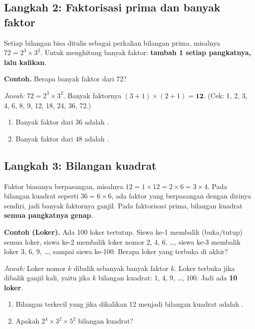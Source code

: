 \documentclass[11pt,a4paper]{article}
\begin{document}
\subsection*{Langkah 2: Faktorisasi prima dan banyak faktor}
Setiap bilangan bisa ditulis sebagai perkalian bilangan prima, misalnya $72 = 2^3 \times 3^2$.
Untuk menghitung banyak faktor: \textbf{tambah 1 setiap pangkatnya, lalu kalikan}.

\begin{contoh}
\textbf{Contoh.} Berapa banyak faktor dari 72?

\textit{Jawab:} $72 = 2^3 \times 3^2$. Banyak faktornya $(3 + 1) \times (2 + 1) = \textbf{12}$.
(Cek: 1, 2, 3, 4, 6, 8, 9, 12, 18, 24, 36, 72.)
\end{contoh}

\begin{giliranmu}
\begin{enumerate}[label=\alph*.]
    \item Banyak faktor dari $36$ adalah \kosong.
    \item Banyak faktor dari $48$ adalah \kosong.
\end{enumerate}
\end{giliranmu}

\subsection*{Langkah 3: Bilangan kuadrat}
Faktor biasanya berpasangan, misalnya $12 = 1 \times 12 = 2 \times 6 = 3 \times 4$. Pada bilangan
kuadrat seperti $36 = 6 \times 6$, ada faktor yang berpasangan dengan dirinya sendiri, jadi banyak
faktornya ganjil. Pada faktorisasi prima, bilangan kuadrat \textbf{semua pangkatnya genap}.

\begin{contoh}
\textbf{Contoh (Loker).} Ada 100 loker tertutup. Siswa ke-1 membalik (buka/tutup) semua loker,
siswa ke-2 membalik loker nomor 2, 4, 6, \dots, siswa ke-3 membalik loker 3, 6, 9, \dots, sampai
siswa ke-100. Berapa loker yang terbuka di akhir?

\textit{Jawab:} Loker nomor $k$ dibalik sebanyak banyak faktor $k$. Loker terbuka jika dibalik
ganjil kali, yaitu jika $k$ bilangan kuadrat: 1, 4, 9, \dots, 100. Jadi ada \textbf{10 loker}.
\end{contoh}

\begin{giliranmu}
\begin{enumerate}[label=\alph*.]
    \item Bilangan terkecil yang jika dikalikan 12 menjadi bilangan kuadrat adalah \kosong.
    \item Apakah $2^4 \times 3^2 \times 5^2$ bilangan kuadrat? \kosong
\end{enumerate}
\end{giliranmu}
\end{document}
